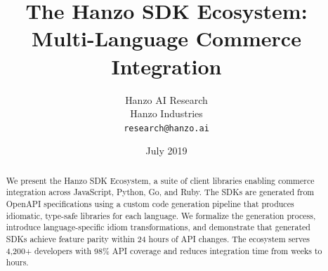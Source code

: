 \documentclass[11pt,a4paper]{article}
\title{\textbf{The Hanzo SDK Ecosystem:\\Multi-Language Commerce Integration}}
\author{
    Hanzo AI Research\\
    Hanzo Industries\\
    \texttt{research@hanzo.ai}
}
\date{July 2019}
\begin{document}
\hanzocoverpage

\begin{abstract}
We present the Hanzo SDK Ecosystem, a suite of client libraries enabling commerce integration across JavaScript, Python, Go, and Ruby. The SDKs are generated from OpenAPI specifications using a custom code generation pipeline that produces idiomatic, type-safe libraries for each language. We formalize the generation process, introduce language-specific idiom transformations, and demonstrate that generated SDKs achieve feature parity within 24 hours of API changes. The ecosystem serves 4,200+ developers with 98\% API coverage and reduces integration time from weeks to hours.
\end{abstract}















\end{document}
